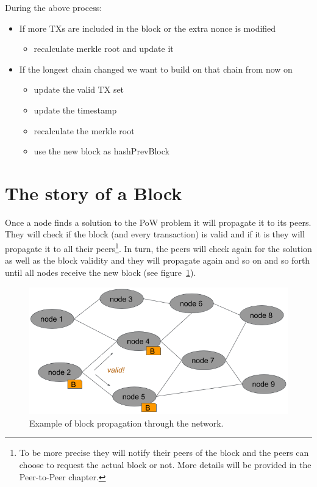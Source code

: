 During the above process:
\begin{itemize}
\item If more TXs are included in the block or the extra nonce is modified
  \begin{itemize}
  \item recalculate merkle root and update it
  \end{itemize}
\item If the longest chain changed we want to build on that chain from now on
  \begin{itemize}
  \item update the valid TX set
  \item update the timestamp
  \item recalculate the merkle root
  \item use the new block as hashPrevBlock
  \end{itemize}
\end{itemize}


\section{The story of a Block}
\label{sec:blocks-nakamote-consensus}
Once a node finds a solution to the PoW problem it will propagate it to its peers. They will check if the block (and every transaction) is valid and if it is they will propagate it to all their peers\footnote{To be more precise they will notify their peers of the block and the peers can choose to request the actual block or not. More details will be provided in the Peer-to-Peer chapter.}. In turn, the peers will check again for the solution as well as the block validity and they will propagate again and so on and so forth until all nodes receive the new block (see figure~\ref{fig:block-propagation}).

\begin{figure}[h]
\begin{center}
\includegraphics[scale=0.5]{images/block-propagation}
\caption{Example of block propagation through the network.}
\label{fig:block-propagation}
\end{center}
\end{figure}

